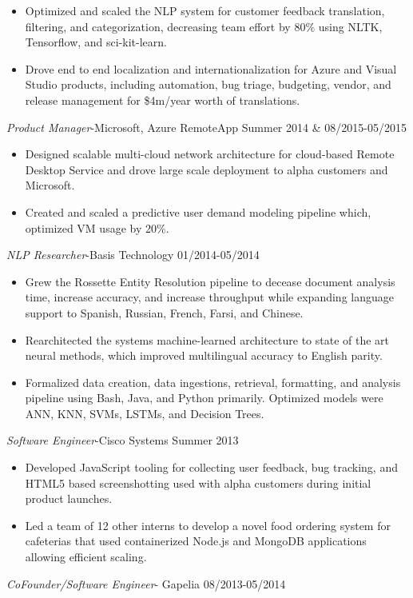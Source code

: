 \documentclass[line,margin]{res}
\begin{document}
\begin{resume}
\begin{itemize}
\item Optimized and scaled the NLP system for customer feedback translation, filtering, and categorization, decreasing team effort by $80\%$ using NLTK, Tensorflow, and sci-kit-learn.
\item Drove end to end localization and internationalization for Azure and Visual Studio products, including automation, bug triage, budgeting, vendor, and release management for \$4m/year worth of translations.
\end{itemize}
{\sl Product Manager}-Microsoft, Azure RemoteApp  \hfill Summer 2014 \& 08/2015-05/2015
\begin{itemize}  \itemsep -4pt
\item Designed scalable multi-cloud network architecture for cloud-based Remote Desktop Service and drove large scale deployment to alpha customers and Microsoft.
\item Created and scaled a predictive user demand modeling pipeline which, optimized VM usage by 20\%.
\end{itemize}
{\sl NLP Researcher}-Basis Technology \hfill 01/2014-05/2014
\begin{itemize}  \itemsep -4pt
\item Grew the Rossette Entity Resolution pipeline to decease document analysis time, increase accuracy, and increase throughput while expanding language support to Spanish, Russian, French, Farsi, and Chinese.
\item Rearchitected the systems machine-learned architecture to state of the art neural methods, which improved multilingual accuracy to English parity.
\item Formalized data creation, data ingestions, retrieval, formatting, and analysis pipeline using Bash, Java, and Python primarily. Optimized models were ANN, KNN, SVMs, LSTMs, and Decision Trees.
\end{itemize}
{\sl Software Engineer}-Cisco Systems \hfill Summer 2013
\begin{itemize}  \itemsep -4pt
\item Developed JavaScript tooling for collecting user feedback, bug tracking, and HTML5 based screenshotting used with alpha customers during initial product launches. 
\item Led a team of 12 other interns to develop a novel food ordering system for cafeterias that used containerized Node.js and MongoDB applications allowing efficient scaling.
\end{itemize}
{\sl CoFounder/Software Engineer}- Gapelia \hfill 08/2013-05/2014

\end{resume}
\end{document}
